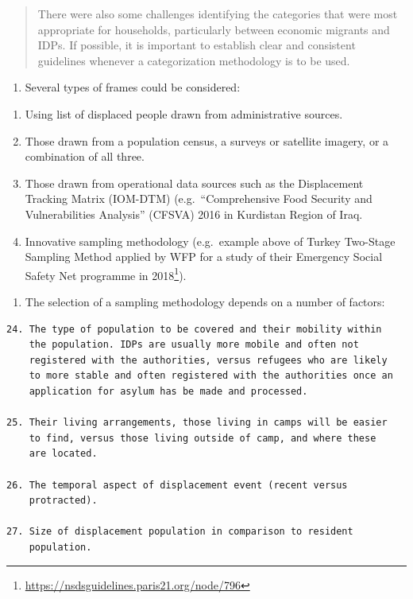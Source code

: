 \documentclass[
]{article}
\providecommand{\tightlist}{%
  \setlength{\itemsep}{0pt}\setlength{\parskip}{0pt}}
\begin{document}
\begin{quote}
There were also some challenges identifying the categories that were most appropriate for households, particularly between economic migrants and IDPs. If possible, it is important to establish clear and consistent guidelines whenever a categorization methodology is to be used.
\end{quote}

\begin{enumerate}
\def\labelenumi{\arabic{enumi}.}
\setcounter{enumi}{136}
\tightlist
\item
  Several types of frames could be considered:
\end{enumerate}

\begin{enumerate}
\def\labelenumi{\roman{enumi}.}
\item
  Using list of displaced people drawn from administrative sources.
\item
  Those drawn from a population census, a surveys or satellite
  imagery, or a combination of all three.
\item
  Those drawn from operational data sources such as the Displacement
  Tracking Matrix (IOM-DTM) (e.g.~``Comprehensive Food Security and
  Vulnerabilities Analysis'' (CFSVA) 2016 in Kurdistan Region of Iraq.
\item
  Innovative sampling methodology (e.g.~example above of Turkey
  Two-Stage Sampling Method applied by WFP for a study of their
  Emergency Social Safety Net programme in 2018\footnote{\url{https://nsdsguidelines.paris21.org/node/796}}).
\end{enumerate}

\begin{enumerate}
\def\labelenumi{\arabic{enumi}.}
\setcounter{enumi}{137}
\tightlist
\item
  The selection of a sampling methodology depends on a number of
  factors:
\end{enumerate}

\begin{verbatim}
24. The type of population to be covered and their mobility within
    the population. IDPs are usually more mobile and often not
    registered with the authorities, versus refugees who are likely
    to more stable and often registered with the authorities once an
    application for asylum has be made and processed.

25. Their living arrangements, those living in camps will be easier
    to find, versus those living outside of camp, and where these
    are located.

26. The temporal aspect of displacement event (recent versus
    protracted).

27. Size of displacement population in comparison to resident
    population.
\end{verbatim}
\end{document}
